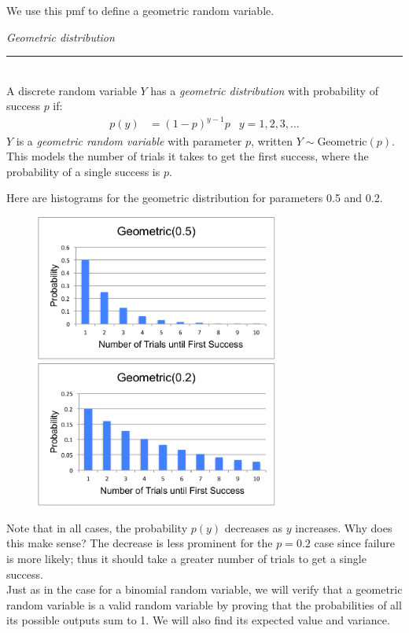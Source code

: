 \documentclass[12pt]{article}
\theoremstyle{definition}
\theoremstyle{remark}
\begin{document}
We use this pmf to define a geometric random variable.

\begin{framed}
  \emph{Geometric distribution}\\
  \rule{\dimexpr{}\fboxrule}{.1pt} \\
A discrete random variable $Y$ has a \emph{geometric distribution} with probability of success $p$ if: 
\begin{align*}
p(y) &= (1-p)^{y-1} p & y = 1, 2, 3, \dots
\end{align*}
$Y$ is a \emph{geometric random variable} with parameter $p$, written $Y \sim \text{Geometric}(p)$. This models the number of trials it takes to get the first success, where the probability of a single success is $p$.
\end{framed}

Here are histograms for the geometric distribution for parameters 0.5 and 0.2. 

\begin{figure}[H]
\centering
\includegraphics[width=8cm]{geometric5}
\includegraphics[width=8cm]{geometric2}
\end{figure}

Note that in all cases, the probability $p(y)$ decreases as $y$ increases. Why does this make sense? The decrease is less prominent for the $p = 0.2$ case since failure is more likely; thus it should take a greater number of trials to get a single success.\\

Just as in the case for a binomial random variable, we will verify that a geometric random variable is a valid random variable by proving that the probabilities of all its possible outputs sum to 1. We will also find its expected value and variance.\\
\end{document}
